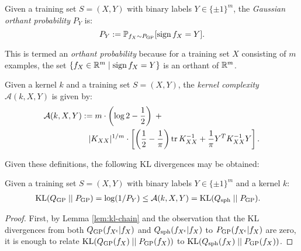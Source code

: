 \begin{refsection}
\begin{definition}\label{def:gop} Given a training set $S=(X,Y)$ with binary labels $Y\in\{\pm1\}^m$, the \textit{Gaussian orthant probability} $P_Y$ is:
\begin{equation}\label{eq:gop}
    P_Y : = \mathbb{P}_{f_X \sim P_{\mathrm{GP}}}[\operatorname{sign} f_X = Y].
\end{equation}
\end{definition}
This is termed an \textit{orthant probability} because for a training set $X$ consisting of $m$ examples, the set $\left\{f_X \in \mathbb{R}^m \;\middle|\; \operatorname{sign} f_X = Y\right\}$ is an orthant of $\mathbb{R}^m$.
\begin{definition}\label{def:k-complex} Given a kernel $k$ and a training set $S=(X,Y)$, the \textit{kernel complexity} $\mathcal{A}(k,X,Y)$ is given by:
\begin{align}
    \mathcal{A}(k,X,Y):= m\cdot\left(\log 2 - \frac{1}{2}\right) \;+ \qquad\qquad\qquad\qquad\qquad\qquad \nonumber\\
    \vert {K_{XX}} \vert^{1/m}\cdot\left[ \left(\frac{1}{2} - \frac{1}{\pi}\right)\operatorname{tr} K_{XX}^{-1} + \frac{1}{\pi} Y^T K_{XX}^{-1}Y \right].
\end{align}
\end{definition}
Given these definitions, the following KL divergences may be obtained:
\begin{lemma}\label{lem:kl-gp}
Given a training set $S=(X,Y)$ with binary labels $Y\in\{\pm1\}^m$ and a kernel $k$:
    \begin{align}
        \mathrm{KL}(Q_\mathrm{GP} \;||\; P_\mathrm{GP}) &= \log (1/P_Y) \leq \mathcal{A}(k,X,Y) = \mathrm{KL}(Q_\mathrm{sph} \;||\; P_\mathrm{GP}).
    \end{align}
\end{lemma}
\begin{proof} First, by Lemma \ref{lem:kl-chain} and the observation that the KL divergences from both $Q_\mathrm{GP}(f_{X^\mathsf{c}} | f_X)$ and $Q_\mathrm{sph}(f_{X^\mathsf{c}} | f_X)$ to $P_\mathrm{GP}(f_{X^\mathsf{c}} | f_X)$ are zero, it is enough to relate $\mathrm{KL}(Q_\mathrm{GP}(f_X)\;||\;P_\mathrm{GP}(f_X))$ to $\mathrm{KL}(Q_\mathrm{sph}(f_X)\;||\;P_\mathrm{GP}(f_X))$.


\end{proof}
\end{refsection}
